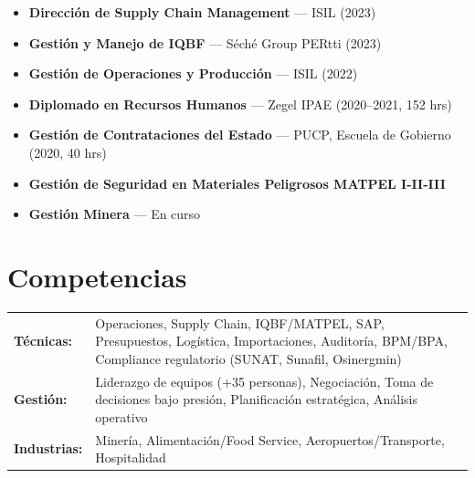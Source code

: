 \documentclass[11pt,letterpaper]{article}
\begin{document}
\begin{itemize}
  \item \textbf{Direcci\'on de Supply Chain Management} --- ISIL (2023)
  \item \textbf{Gesti\'on y Manejo de IQBF} --- S\'ech\'e Group PERtti (2023)
  \item \textbf{Gesti\'on de Operaciones y Producci\'on} --- ISIL (2022)
  \item \textbf{Diplomado en Recursos Humanos} --- Zegel IPAE (2020--2021, 152 hrs)
  \item \textbf{Gesti\'on de Contrataciones del Estado} --- PUCP, Escuela de Gobierno (2020, 40 hrs)
  \item \textbf{Gesti\'on de Seguridad en Materiales Peligrosos MATPEL I-II-III}
  \item \textbf{Gesti\'on Minera} --- En curso
\end{itemize}
\vspace{0.3em}

\section{Competencias}

\begin{tabularx}{\textwidth}{@{}l X@{}}
\textbf{T\'ecnicas:} & Operaciones, Supply Chain, IQBF/MATPEL, SAP, Presupuestos, Log\'istica, Importaciones, Auditor\'ia, BPM/BPA, Compliance regulatorio (SUNAT, Sunafil, Osinergmin) \\[3pt]
\textbf{Gesti\'on:} & Liderazgo de equipos (+35 personas), Negociaci\'on, Toma de decisiones bajo presi\'on, Planificaci\'on estrat\'egica, An\'alisis operativo \\[3pt]
\textbf{Industrias:} & Miner\'ia, Alimentaci\'on/Food Service, Aeropuertos/Transporte, Hospitalidad \\
\end{tabularx}
\end{document}
